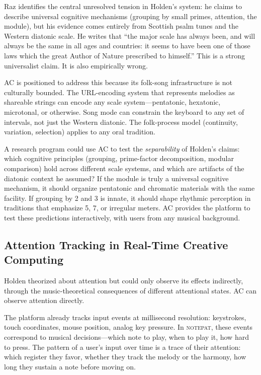 \documentclass[10pt,letterpaper,twocolumn]{article}
\newcommand{\np}{\textsc{notepat}}
\begin{document}
Raz identifies the central unresolved tension in Holden's system: he claims to describe universal cognitive mechanisms (grouping by small primes, attention, the module), but his evidence comes entirely from Scottish psalm tunes and the Western diatonic scale. He writes that ``the major scale has always been, and will always be the same in all ages and countries: it seems to have been one of those laws which the great Author of Nature prescribed to himself.'' This is a strong universalist claim. It is also empirically wrong.

AC is positioned to address this because its folk-song infrastructure is not culturally bounded. The URL-encoding system that represents melodies as shareable strings can encode any scale system---pentatonic, hexatonic, microtonal, or otherwise. Song mode can constrain the keyboard to any set of intervals, not just the Western diatonic. The folk-process model (continuity, variation, selection) applies to any oral tradition.

A research program could use AC to test the \emph{separability} of Holden's claims: which cognitive principles (grouping, prime-factor decomposition, modular comparison) hold across different scale systems, and which are artifacts of the diatonic context he assumed? If the module is truly a universal cognitive mechanism, it should organize pentatonic and chromatic materials with the same facility. If grouping by 2 and 3 is innate, it should shape rhythmic perception in traditions that emphasize 5, 7, or irregular meters. AC provides the platform to test these predictions interactively, with users from any musical background.

\subsection{Attention Tracking in Real-Time Creative Computing}

Holden theorized about attention but could only observe its effects indirectly, through the music-theoretical consequences of different attentional states. AC can observe attention directly.

The platform already tracks input events at millisecond resolution: keystrokes, touch coordinates, mouse position, analog key pressure. In \np{}, these events correspond to musical decisions---which note to play, when to play it, how hard to press. The pattern of a user's input over time is a trace of their attention: which register they favor, whether they track the melody or the harmony, how long they sustain a note before moving on.
\end{document}
